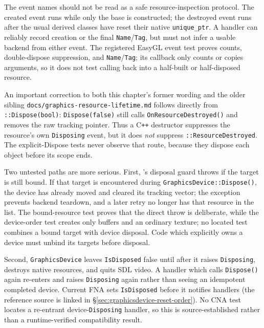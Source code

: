 The event names should not be read as a safe resource-inspection protocol. The created event runs
while only the  base is constructed; the destroyed event runs after
the usual derived classes have reset their native \texttt{unique\_ptr}. A handler can reliably
record creation or the final \texttt{Name}/\texttt{Tag}, but must not infer a usable backend from
either event. The registered EasyGL event test proves counts, double-dispose suppression, and
\texttt{Name}/\texttt{Tag}; its callback only counts or copies arguments, so it does not test
calling back into a half-built or half-disposed resource.

An important correction to both this chapter's former wording and the older sibling
\texttt{docs/\allowbreak{}graphics-resource-lifetime.md} follows directly from
\allowbreak\texttt{::Dispose(bool)}: \texttt{Dispose(false)} still calls
\texttt{OnResource\allowbreak{}Destroyed()} and removes the raw tracking pointer. Thus a C\texttt{++}
destructor suppresses the resource's own \texttt{Disposing} event, but it does \emph{not}
suppress \allowbreak\texttt{::ResourceDestroyed}. The explicit-Dispose tests never observe
that route, because they dispose each object before its scope ends.

Two untested paths are more serious. First, 's disposal guard throws if
the target is still bound. If that target is encountered during
\texttt{GraphicsDevice::Dispose()}, the device has already moved and cleared its tracking vector;
the exception prevents backend teardown, and a later retry no longer has that resource in the
list. The bound-resource test proves that the direct throw is deliberate, while the device-order
test creates only buffers and an ordinary texture; no located test combines a bound target with
device disposal. Code which explicitly owns a device must unbind its targets before disposal.

Second, \texttt{GraphicsDevice} leaves \texttt{IsDisposed} false until after it raises
\texttt{Disposing}, destroys native resources, and quits SDL video. A handler which calls
\texttt{Dispose()} again re-enters and raises \texttt{Disposing} again rather than seeing an
idempotent completed device. Current FNA sets \texttt{IsDisposed} before it notifies handlers
(the reference source is linked in \S\ref{sec:graphicsdevice-reset-order}). No CNA test locates
a re-entrant device-\texttt{Disposing} handler, so this is source-established rather than a
runtime-verified compatibility result.

